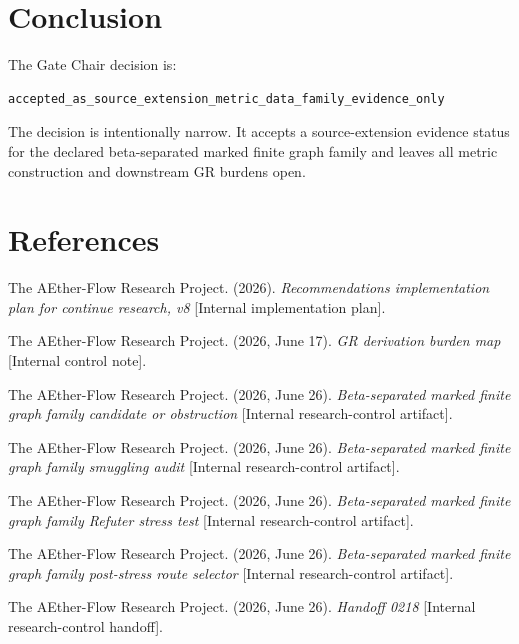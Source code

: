 \documentclass[11pt]{article}
\begin{document}
\section{Conclusion}

The Gate Chair decision is:

\begin{verbatim}
accepted_as_source_extension_metric_data_family_evidence_only
\end{verbatim}

The decision is intentionally narrow. It accepts a source-extension evidence
status for the declared beta-separated marked finite graph family and leaves
all metric construction and downstream GR burdens open.

\section*{References}

The AEther-Flow Research Project. (2026). \textit{Recommendations
implementation plan for continue research, v8} [Internal implementation
plan].

The AEther-Flow Research Project. (2026, June 17). \textit{GR derivation
burden map} [Internal control note].

The AEther-Flow Research Project. (2026, June 26). \textit{Beta-separated
marked finite graph family candidate or obstruction} [Internal
research-control artifact].

The AEther-Flow Research Project. (2026, June 26). \textit{Beta-separated
marked finite graph family smuggling audit} [Internal research-control
artifact].

The AEther-Flow Research Project. (2026, June 26). \textit{Beta-separated
marked finite graph family Refuter stress test} [Internal research-control
artifact].

The AEther-Flow Research Project. (2026, June 26). \textit{Beta-separated
marked finite graph family post-stress route selector} [Internal
research-control artifact].

The AEther-Flow Research Project. (2026, June 26). \textit{Handoff 0218}
[Internal research-control handoff].
\end{document}
